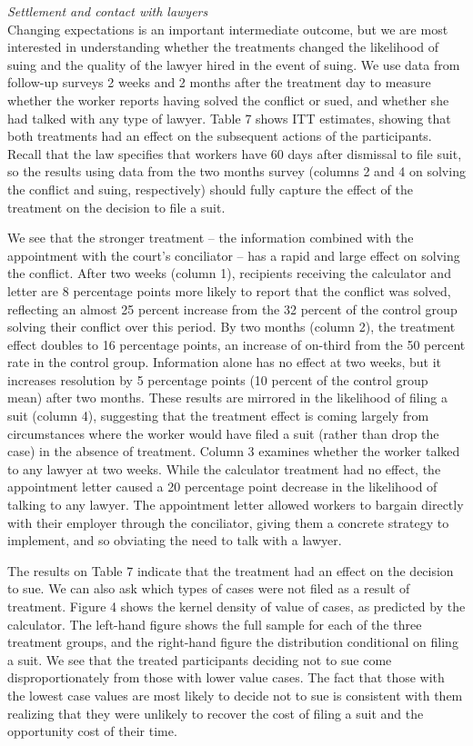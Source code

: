 \documentclass[oneside,12pt]{article}
\begin{document}
    


\noindent\emph{Settlement and contact with lawyers}\\
Changing expectations is an important intermediate outcome, but we are most interested in understanding whether the treatments changed the likelihood of suing and the quality of the lawyer hired in the event of suing. We use data from follow-up surveys 2 weeks and 2 months after the treatment day to measure whether the worker reports having solved the conflict or sued, and whether she had talked with any type of lawyer. Table 7 shows ITT estimates, showing that both treatments had an effect on the subsequent actions of the participants. Recall that the law specifies that workers have 60 days after dismissal to file suit, so the results using data from the two months survey (columns 2 and 4 on solving the conflict and suing, respectively) should fully capture the effect of the treatment on the decision to file a suit.

We see that the stronger treatment – the information combined with the appointment with the court’s conciliator – has a rapid and large effect on solving the conflict. After two weeks (column 1), recipients receiving the calculator and letter are 8 percentage points more likely to report that the conflict was solved, reflecting an almost 25 percent increase from the 32 percent of the control group solving their conflict over this period. By two months (column 2), the treatment effect doubles to 16 percentage points, an increase of on-third from the 50 percent rate in the control group. Information alone has no effect at two weeks, but it increases resolution by 5 percentage points (10 percent of the control group mean) after two months. These results are mirrored in the likelihood of filing a suit (column 4), suggesting that the treatment effect is coming largely from circumstances where the worker would have filed a suit (rather than drop the case) in the absence of treatment. Column 3 examines whether the worker talked to any lawyer at two weeks. While the calculator treatment had no effect, the appointment letter caused a 20 percentage point decrease in the likelihood of talking to any lawyer. The appointment letter allowed workers to bargain directly with their employer through the conciliator, giving them a concrete strategy to implement, and so obviating the need to talk with a lawyer.

The results on Table 7 indicate that the treatment had an effect on the decision to sue. We can also ask which types of cases were not filed as a result of treatment. Figure 4 shows the kernel density of value of cases, as predicted by the calculator. The left-hand figure shows the full sample for each of the three treatment groups, and the right-hand figure the distribution conditional on filing a suit. We see that the treated participants deciding not to sue come disproportionately from those with lower value cases. The fact that those with the lowest case values are most likely to decide not to sue is consistent with them realizing that they were unlikely to recover the cost of filing a suit and the opportunity cost of their time. 
\end{document}

